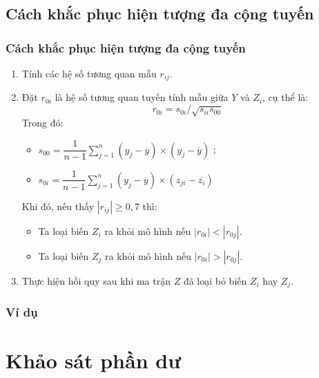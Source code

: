 \begin{footnotesize}
\subsection{Cách khắc phục hiện tượng đa cộng tuyến}
\begin{frame}
\frametitle{Cách khắc phục hiện tượng đa cộng tuyến}
\begin{enumerate}
    \item Tính các hệ số tương quan mẫu $r_{ij}$.
	\item Đặt $r_{0i}$ là hệ số tương quan tuyến tính mẫu giữa $Y$ và $Z_i$, cụ thể là:
	$$r_{0i} = s_{0i}/\sqrt{s_{ii}s_{00}}$$
	Trong đó:
    \begin{itemize}
    \item $s_{00} = \dfrac{1}{n-1}\sum\limits_{j=1}^n{(y_j - \overline{y}) \times( y_j-\overline{y}) }$ ; \item $s_{0i} = \dfrac{1}{n-1}\sum\limits_{j=1}^n{(y_j - \overline{y}) \times( z_{ji}-\overline{z_i}) }$ \end{itemize}
	Khi đó, nếu thấy $|r_{ij}| \geq 0,7$ thì:
	\begin{itemize}
	    \item Ta loại biến $Z_i$ ra khỏi mô hình nếu $|r_{0i}| < |r_{0j}|$.
	    \item Ta loại biến $Z_j$ ra khỏi mô hình nếu $|r_{0i}| > |r_{0j}|$.
	\end{itemize} 
	\item Thực hiện hồi quy sau khi ma trận $Z$ đã loại bỏ biến $Z_i$ hay $Z_j$.
\end{enumerate}
\end{frame}
\begin{frame}
\frametitle{Ví dụ}
    
\end{frame}
\end{footnotesize}



\section{Khảo sát phần dư}

